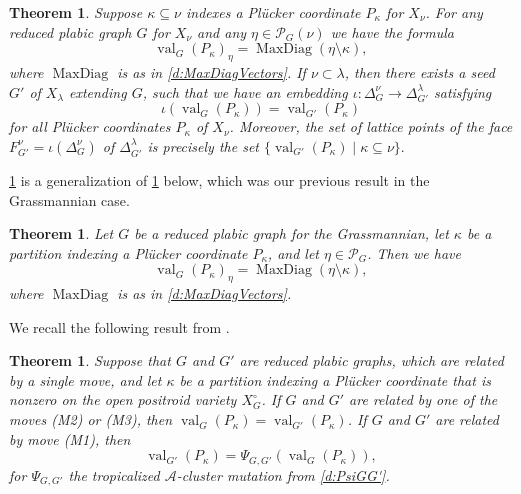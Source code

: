 \documentclass{amsart}
\newtheorem{theorem}[thm]{Theorem}
\theoremstyle{definition}
\numberwithin{equation}{section}
\newcommand{\val}{{\operatorname{val}}}
\newcommand{\maxdiag}{{\operatorname{MaxDiag}}}
\begin{document}
\begin{theorem}\label{p:latticepoints-comp}
Suppose $\kappa\subseteq\nu$ indexes a  Pl\"ucker coordinate $P_\kappa$ for $X_\nu$. For any reduced plabic graph $G$ for $X_\nu$ and any $\eta\in\mathcal P_G(\nu)$ we have the formula
\begin{equation}\label{e:GenMaxDiag}
\val_G(P_\kappa)_\eta=\maxdiag(\eta\setminus\kappa),
\end{equation}
where $\maxdiag$ is as in \cref{d:MaxDiagVectors}.
If $\nu\subset\lambda$, then there exists a seed $G'$ of  $X_\lambda$ extending $G$, such that we have an embedding $\iota:\Delta^\nu_G\to \Delta^\lambda_{G'}$ 
satisfying 
\begin{equation}\label{e:iotaonvalG}
\iota(\val_G(P_\kappa))=\val_{G'}(P_\kappa)
\end{equation}
for all Pl\"ucker coordinates $P_\kappa$ of $X_\nu$.
Moreover, the set of lattice points of the face $F_{G'}^\nu=\iota(\Delta^\nu_G)$ of $\Delta^\lambda_{G'}$ is precisely the set
$
\{\val_{G'}(P_\kappa)\mid \kappa\subseteq \nu\}.
$
\end{theorem} 

\cref{p:latticepoints-comp} is a generalization of  
\cref{thm:maxdiag} below,
 which was our previous
result in the Grassmannian case.
\begin{theorem}\cite[Theorem 15.1]{RW}\label{thm:maxdiag}
Let $G$ be a reduced plabic graph for the Grassmannian, let $\kappa$ be a 
partition indexing a Pl\"ucker coordinate $P_\kappa$, and let $\eta \in \mathcal{P}_G$.  Then we have
\begin{equation}
\val_G(P_\kappa)_{\eta} = \maxdiag(\eta \setminus \kappa),
\end{equation}
where $\maxdiag$ is as in \cref{d:MaxDiagVectors}.
\end{theorem}

 We recall the following result from \cite{RW}.
\begin{theorem}\cite[Theorem 13.1]{RW}\label{thm:flowmutate}
Suppose that $G$ and $G'$ are reduced plabic graphs, which are related by a single
move, and let ${\kappa}$ be a partition indexing a Pl\"ucker coordinate that is nonzero on the 
open positroid variety $X_G^{\circ}$.  
If $G$ and $G'$ are related by one of the moves (M2) or (M3), then
$\val_G(P_{\kappa}) = \val_{G'}(P_{\kappa})$.
If $G$ and $G'$ are related by move (M1), then
	\begin{equation*}
		\val_{G'}(P_{\kappa}) = \Psi_{G,G'}(\val_G(P_{\kappa})),
	\end{equation*}
	for $\Psi_{G,G'}$ the tropicalized $\mathcal{A}$-cluster mutation from 
	\cref{d:PsiGG'}.
\end{theorem}
\end{document}
